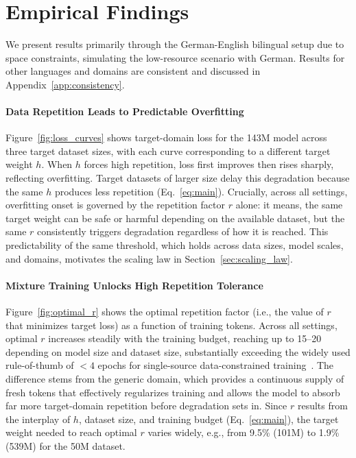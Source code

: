 \section{Empirical Findings}
\label{sec:results}

We present results primarily through the German-English bilingual setup due to space constraints,  simulating the low-resource scenario with German.
Results for other languages and domains are consistent and discussed in Appendix~\ref{app:consistency}.

\paragraph{Data Repetition Leads to Predictable Overfitting}

Figure~\ref{fig:loss_curves} shows target-domain loss for the 143M model across three target dataset sizes, with each curve corresponding to a different target weight $h$. When $h$ forces high repetition, loss first improves then rises sharply, reflecting overfitting.
Target datasets of larger size delay this degradation because the same $h$ produces less repetition (Eq.~\ref{eq:main}).
Crucially, across all settings, overfitting onset is governed by the repetition factor $r$ alone: it means, the same target weight can be safe or harmful depending on the available dataset, but the same $r$ consistently triggers degradation regardless of how it is reached.               
This predictability of the same threshold, which holds across data sizes, model scales, and domains, motivates the scaling law in Section~\ref{sec:scaling_law}.

\paragraph{Mixture Training Unlocks High Repetition Tolerance}

Figure~\ref{fig:optimal_r} shows the optimal repetition factor (i.e., the value of $r$ that minimizes target loss) as a function of training tokens. 
Across all settings, optimal $r$ increases steadily with the training budget, reaching up to 15–20 depending on model size and dataset size, substantially exceeding the widely used rule-of-thumb of $<4$ epochs for single-source data-constrained training~\citep{muennighoff2023scaling}.
The difference stems from the generic domain, which provides a continuous supply of fresh tokens that effectively regularizes training and allows the model to absorb far more target-domain repetition before degradation sets in. Since $r$ results from the interplay of $h$, dataset size, and training budget (Eq.~\ref{eq:main}), the target weight needed to reach optimal $r$ varies widely, e.g., from 9.5\% (101M) to 1.9\% (539M) for the 50M dataset.


